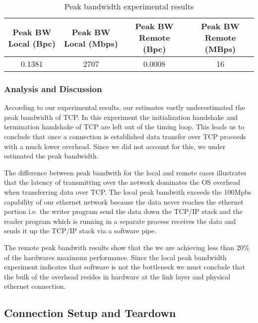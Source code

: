 \begin{table*}[b]
\begin{tabular}{|c|c|c|c|}
\hline
Peak BW Local (Bpc) & Peak BW Local (Mbps) & Peak BW Remote (Bpc) & Peak BW Remote (MBps) \\ \hline
0.1381            & 2707          & 0.0008            & 16          \\ \hline
\end{tabular}
\caption{Peak bandwidth experimental results}
\label{table:peak-results}
\end{table*}

\subsubsection{Analysis and Discussion}
According to our experimental results, our estimates vastly underestimated the peak bandwidth of TCP.
In this experiment the initialization handshake and termination handshake of TCP are left out of the timing loop. This leads us to conclude that once a connection is established data transfer over TCP 
proceeds with a much lower overhead. Since we did not account for this, we under estimated the peak
bandwidth.

The difference between peak bandwith for the local and remote cases illustrates that the latency of 
transmitting over the network dominates the OS overhead when transferring data over TCP. The local 
peak bandwith exceeds the 100Mpbs capability of our ethernet network because the data never reaches
the ethernet portion i.e. the writer program send the data down the TCP/IP stack and the reader 
program which is running in a separate process receives the data and sends it up the TCP/IP stack via
 a software pipe. 

The remote peak bandwith results show that the we are achieving less than 20\% of the hardwares 
maximum performance. Since the local peak bandwidth experiment indicates that software is not the 
bottleneck we must conclude that the bulk of the overhead resides in hardware at the link layer and
physical ethernet connection. 

\subsection{Connection Setup and Teardown}

